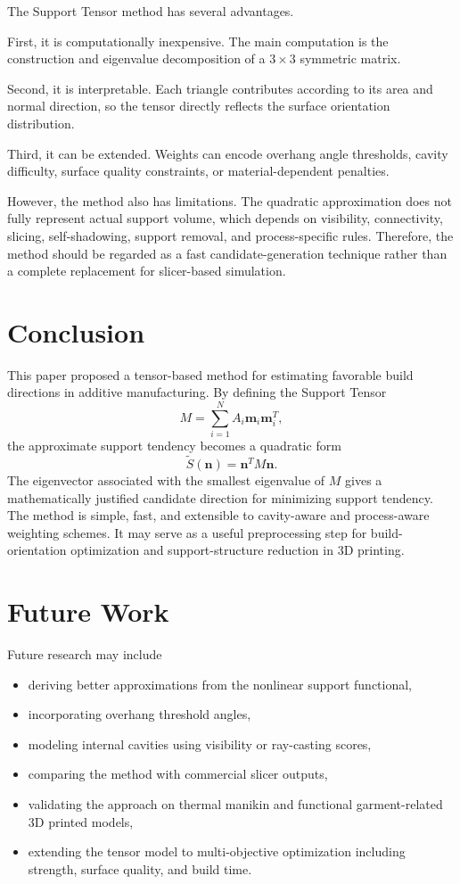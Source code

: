 \documentclass[11pt,a4paper]{article}
\begin{document}
The Support Tensor method has several advantages.

First, it is computationally inexpensive.
The main computation is the construction and eigenvalue decomposition of a $3\times 3$ symmetric matrix.

Second, it is interpretable.
Each triangle contributes according to its area and normal direction, so the tensor directly reflects the surface orientation distribution.

Third, it can be extended.
Weights can encode overhang angle thresholds, cavity difficulty, surface quality constraints, or material-dependent penalties.

However, the method also has limitations.
The quadratic approximation does not fully represent actual support volume, which depends on visibility, connectivity, slicing, self-shadowing, support removal, and process-specific rules.
Therefore, the method should be regarded as a fast candidate-generation technique rather than a complete replacement for slicer-based simulation.

\section{Conclusion}

This paper proposed a tensor-based method for estimating favorable build directions in additive manufacturing.
By defining the Support Tensor
\[
M
=
\sum_{i=1}^{N}
A_i
\bm m_i\bm m_i^T,
\]
the approximate support tendency becomes a quadratic form
\[
\widetilde S(\bm n)=\bm n^T M\bm n.
\]
The eigenvector associated with the smallest eigenvalue of $M$ gives a mathematically justified candidate direction for minimizing support tendency.
The method is simple, fast, and extensible to cavity-aware and process-aware weighting schemes.
It may serve as a useful preprocessing step for build-orientation optimization and support-structure reduction in 3D printing.

\section*{Future Work}

Future research may include

\begin{itemize}
\item deriving better approximations from the nonlinear support functional,
\item incorporating overhang threshold angles,
\item modeling internal cavities using visibility or ray-casting scores,
\item comparing the method with commercial slicer outputs,
\item validating the approach on thermal manikin and functional garment-related 3D printed models,
\item extending the tensor model to multi-objective optimization including strength, surface quality, and build time.
\end{itemize}
\end{document}
